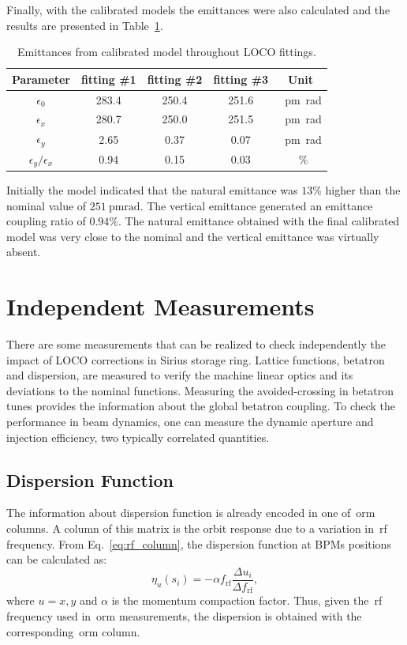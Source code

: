 Finally, with the calibrated models the emittances were also calculated and the results are presented in Table~\ref{tab:calibrated_emittances}.
\begin{table}[h!]
    \centering
    \caption{Emittances from calibrated model throughout LOCO fittings.}
    \label{tab:calibrated_emittances}
    \begin{tabular}{ccccc}
        \toprule\toprule
        Parameter & fitting \#1 & fitting \#2 & fitting \#3 & Unit \\
        \hline
        $\epsilon_0$ & \num{283.4} & \num{250.4} & \num{251.6} & \SI{}{\pico\meter\radian}  \\
        $\epsilon_x$ & \num{280.7} & \num{250.0} & \num{251.5} & \SI{}{\pico\meter\radian} \\
        $\epsilon_y$ &  \num{2.65} &  \num{0.37} & \num{0.07} & \SI{}{\pico\meter\radian}  \\
        $\epsilon_y/\epsilon_x$ &  \num{0.94} &  \num{0.15} & \num{0.03} & \SI{}{\%} \\
        \bottomrule\bottomrule
    \end{tabular}
\end{table}

Initially the model indicated that the natural emittance was $13\%$ higher than the nominal value of $\SI{251}{\pico\meter\radian}$. The vertical emittance generated an emittance coupling ratio of $0.94\%$. The natural emittance obtained with the final calibrated model was very close to the nominal and the vertical emittance was virtually absent.

\section{Independent Measurements}\label{sec:independent_meas}
There are some measurements that can be realized to check independently the impact of LOCO corrections in Sirius storage ring. Lattice functions, betatron and dispersion, are measured to verify the machine linear optics and its deviations to the nominal functions. Measuring the avoided-crossing in betatron tunes provides the information about the global betatron coupling. To check the performance in beam dynamics, one can measure the dynamic aperture and injection efficiency, two typically correlated quantities. 

\subsection{Dispersion Function}
The information about dispersion function is already encoded in one of~\gls{orm} columns. A column of this matrix is the orbit response due to a variation in~\gls{rf} frequency. From Eq.~\eqref{eq:rf_column}, the dispersion function at BPMs positions can be calculated as:
\begin{equation}
\eta_u(s_i) = -\alpha f_{\mathrm{rf}}\dfrac{\Delta u_i}{ \Delta f_{\mathrm{rf}}},
\end{equation}
where $u=x, y$ and $\alpha$ is the momentum compaction factor. Thus, given the~\gls{rf} frequency used in~\gls{orm} measurements, the dispersion is obtained with the corresponding~\gls{orm} column.

